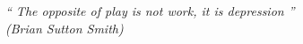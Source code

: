 \begin{epigrafe}
    \vspace*{\fill}
	\begin{flushright}
		

		\textit{`` The opposite of play is not work, it is depression '' \\
		(Brian Sutton Smith)}
	\end{flushright}
\end{epigrafe}
